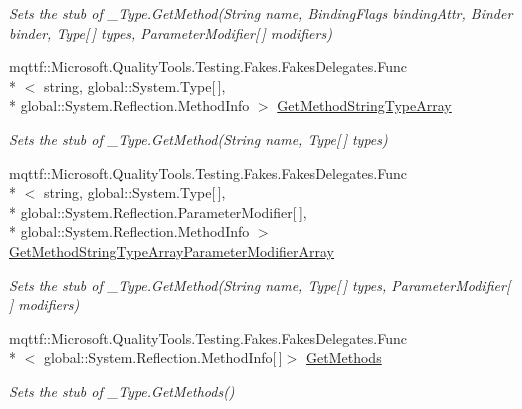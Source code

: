 \begin{DoxyCompactItemize}
\begin{DoxyCompactList}\small\item\em Sets the stub of \-\_\-\-Type.\-Get\-Method(\-String name, Binding\-Flags binding\-Attr, Binder binder, Type\mbox{[}$\,$\mbox{]} types, Parameter\-Modifier\mbox{[}$\,$\mbox{]} modifiers)\end{DoxyCompactList}\item 
mqttf\-::\-Microsoft.\-Quality\-Tools.\-Testing.\-Fakes.\-Fakes\-Delegates.\-Func\\*
$<$ string, global\-::\-System.\-Type\mbox{[}$\,$\mbox{]}, \\*
global\-::\-System.\-Reflection.\-Method\-Info $>$ \hyperlink{class_system_1_1_runtime_1_1_interop_services_1_1_fakes_1_1_stub___type_aa3a040cde0b3d777502e8b062f6fbdaa}{Get\-Method\-String\-Type\-Array}
\begin{DoxyCompactList}\small\item\em Sets the stub of \-\_\-\-Type.\-Get\-Method(\-String name, Type\mbox{[}$\,$\mbox{]} types)\end{DoxyCompactList}\item 
mqttf\-::\-Microsoft.\-Quality\-Tools.\-Testing.\-Fakes.\-Fakes\-Delegates.\-Func\\*
$<$ string, global\-::\-System.\-Type\mbox{[}$\,$\mbox{]}, \\*
global\-::\-System.\-Reflection.\-Parameter\-Modifier\mbox{[}$\,$\mbox{]}, \\*
global\-::\-System.\-Reflection.\-Method\-Info $>$ \hyperlink{class_system_1_1_runtime_1_1_interop_services_1_1_fakes_1_1_stub___type_a5976d348adb70b02e8a6d9b102048ca7}{Get\-Method\-String\-Type\-Array\-Parameter\-Modifier\-Array}
\begin{DoxyCompactList}\small\item\em Sets the stub of \-\_\-\-Type.\-Get\-Method(\-String name, Type\mbox{[}$\,$\mbox{]} types, Parameter\-Modifier\mbox{[}$\,$\mbox{]} modifiers)\end{DoxyCompactList}\item 
mqttf\-::\-Microsoft.\-Quality\-Tools.\-Testing.\-Fakes.\-Fakes\-Delegates.\-Func\\*
$<$ global\-::\-System.\-Reflection.\-Method\-Info\mbox{[}$\,$\mbox{]}$>$ \hyperlink{class_system_1_1_runtime_1_1_interop_services_1_1_fakes_1_1_stub___type_a65a47500598b17b3a2236da7798eac7e}{Get\-Methods}
\begin{DoxyCompactList}\small\item\em Sets the stub of \-\_\-\-Type.\-Get\-Methods()\end{DoxyCompactList}\item 

\end{DoxyCompactItemize}
